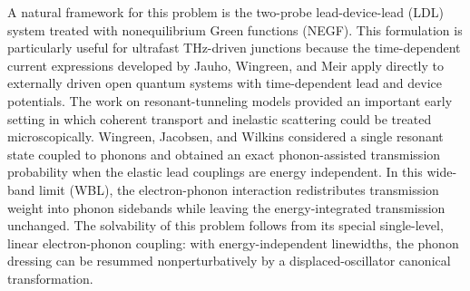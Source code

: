 \documentclass[
 reprint,
 superscriptaddress,
 amsmath,amssymb,
 aps,prb,
 longbibliography,
 floatfix
]{revtex4-2}
\begin{document}
A natural framework for this problem is the two-probe lead-device-lead (LDL) system treated with nonequilibrium Green functions (NEGF). This formulation is particularly useful for ultrafast THz-driven junctions because the time-dependent current expressions developed by Jauho, Wingreen, and Meir \cite{JauhoWingreenMeir1994} apply directly to externally driven open quantum systems with time-dependent lead and device potentials. The work on resonant-tunneling models provided an important early setting in which coherent transport and inelastic scattering could be treated microscopically. Wingreen, Jacobsen, and Wilkins \cite{WingreenJacobsenWilkins1989} considered a single resonant state coupled to phonons and obtained an exact phonon-assisted transmission probability when the elastic lead couplings are energy independent. In this wide-band limit (WBL), the electron-phonon interaction redistributes transmission weight into phonon sidebands while leaving the energy-integrated transmission unchanged. The solvability of this problem follows from its special single-level, linear electron-phonon coupling: with energy-independent linewidths, the phonon dressing can be resummed nonperturbatively by a displaced-oscillator canonical transformation.
\end{document}
